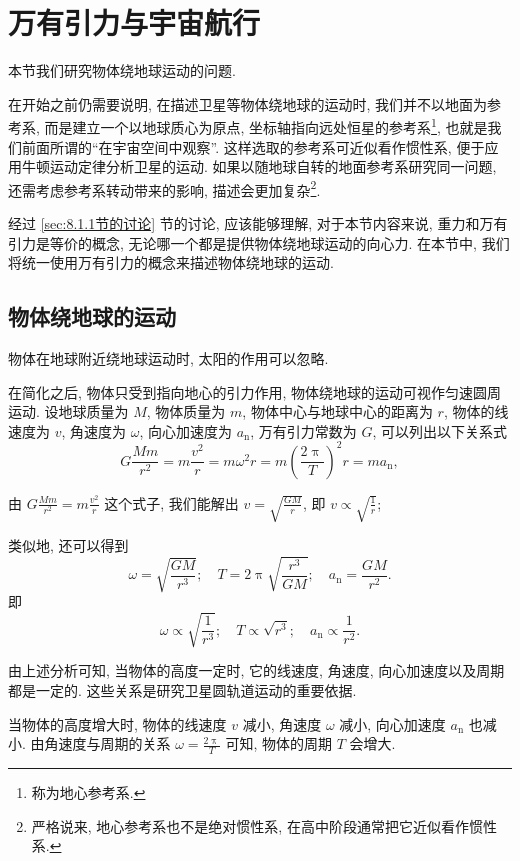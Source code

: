 \documentclass[UTF8,openany,fontset=fandol]{ctexbook}
\theoremstyle{chinesetextbook}
\begin{document}
\section{万有引力与宇宙航行}
本节我们研究物体绕地球运动的问题.

在开始之前仍需要说明, 在描述卫星等物体绕地球的运动时, 我们并不以地面为参考系, 而是建立一个以地球质心为原点, 坐标轴指向远处恒星的参考系\footnote{称为地心参考系.}, 也就是我们前面所谓的“在宇宙空间中观察”. 这样选取的参考系可近似看作惯性系, 便于应用牛顿运动定律分析卫星的运动. 如果以随地球自转的地面参考系研究同一问题, 还需考虑参考系转动带来的影响, 描述会更加复杂\footnote{严格说来, 地心参考系也不是绝对惯性系, 在高中阶段通常把它近似看作惯性系.}.

经过 \ref{sec:8.1.1节的讨论} 节的讨论, 应该能够理解, 对于本节内容来说, 重力和万有引力是等价的概念, 无论哪一个都是提供物体绕地球运动的向心力. 在本节中, 我们将统一使用万有引力的概念来描述物体绕地球的运动.
\subsection{物体绕地球的运动}
物体在地球附近绕地球运动时, 太阳的作用可以忽略.

在简化之后, 物体只受到指向地心的引力作用, 物体绕地球的运动可视作匀速圆周运动. 设地球质量为 $M$, 物体质量为 $m$, 物体中心与地球中心的距离为 $r$, 物体的线速度为 $v$, 角速度为 $\omega$, 向心加速度为 $a_\mathrm{n}$, 万有引力常数为 $G$, 可以列出以下关系式
\begin{equation}\label{eq:宇宙航行1}
G\frac{Mm}{r^2}=m\frac{v^2}{r}=m\omega^2 r=m\left(\frac{2\uppi}{T}\right)^2r=ma_\mathrm{n},
\end{equation}

由 $\displaystyle G\frac{Mm}{r^2}=m\frac{v^2}{r}$ 这个式子, 我们能解出 $v=\sqrt{\displaystyle\frac{GM}{r}}$, 即 $v\propto\sqrt{\displaystyle\frac1r}$;

类似地, 还可以得到
\[
\omega=\sqrt{\displaystyle\frac{GM}{r^3}};\quad T=2\uppi\sqrt{\dfrac{r^3}{GM}};\quad a_\mathrm{n}=\frac{GM}{r^2}.
\]
即
\[
\omega\propto\sqrt{\frac{1}{r^3}};\quad T\propto\sqrt{r^3};\quad a_\mathrm{n}\propto\frac{1}{r^2}.
\]

由上述分析可知, 当物体的高度一定时, 它的线速度, 角速度, 向心加速度以及周期都是一定的. 这些关系是研究卫星圆轨道运动的重要依据.

当物体的高度增大时, 物体的线速度 $v$ 减小, 角速度 $\omega$ 减小, 向心加速度 $a_\mathrm{n}$ 也减小. 由角速度与周期的关系 $\displaystyle\omega=\frac{2\uppi}{T}$ 可知, 物体的周期 $T$ 会增大.
\end{document}
